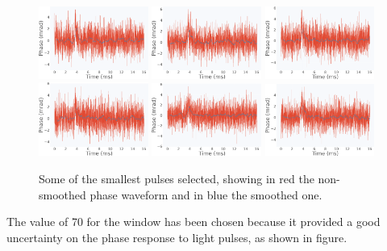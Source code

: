 \documentclass[12pt]{article}
\begin{document}
\begin{figure}[H]
\centering
\includegraphics[width=0.32\textwidth]{figure1.png}
\includegraphics[width=0.32\textwidth]{figure2.png}
\includegraphics[width=0.32\textwidth]{figure3.png}
\includegraphics[width=0.32\textwidth]{figure4.png}
\includegraphics[width=0.32\textwidth]{figure5.png}
\includegraphics[width=0.32\textwidth]{figure6.png}
\caption{Some of the smallest pulses selected, showing in red the non-smoothed phase waveform and in blue the smoothed one.}
\end{figure}
The value of 70 for the window has been chosen because it provided a good uncertainty on the phase response to light pulses, as shown in figure.
\end{document}
